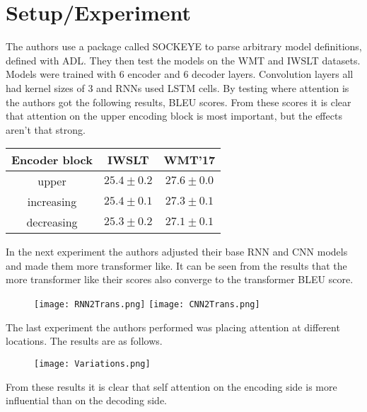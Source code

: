 \section{Setup/Experiment}

The authors use a package called SOCKEYE to parse arbitrary model definitions,
defined with ADL. They then test the models on the WMT and IWSLT datasets.
Models were trained with 6 encoder and 6 decoder layers. Convolution layers all
had kernel sizes of 3 and RNNs used LSTM cells. By testing where attention is
the authors got the following results, BLEU scores. From these scores it is
clear that attention on the upper encoding block is most important, but the
effects aren't that strong. 
\begin{center}
\begin{tabular}{c||c|c}
    Encoder block & IWSLT & WMT'17 \\
    \hline
    upper & $25.4\pm 0.2$ & $27.6 \pm 0.0$\\
    increasing & $25.4\pm 0.1$ & $27.3 \pm 0.1$\\
    decreasing & $25.3 \pm 0.2$ & $27.1 \pm 0.1$
\end{tabular}
\end{center}
In the next experiment the authors adjusted their base RNN and CNN models and
made them more transformer like. It can be seen from the results that the more
transformer like their scores also converge to the transformer BLEU score.
\begin{figure}[ht]
    \texttt{[image: RNN2Trans.png]}
    \texttt{[image: CNN2Trans.png]}
\end{figure}
The last experiment the authors performed was placing attention at different
locations. The results are as follows.
\begin{figure}[ht]
    \center\texttt{[image: Variations.png]}
\end{figure}
From these results it is clear that self attention on the encoding side is more
influential than on the decoding side. 
